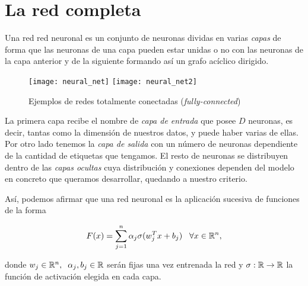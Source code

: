 \section{La red completa}

Una red red neuronal es un conjunto de neuronas dividas en varias \emph{capas} de forma que las neuronas de una capa pueden estar unidas o no con las neuronas de la capa anterior y de la siguiente formando así un grafo acíclico dirigido.\newline

\begin{figure}[htpb]
  \centering
  \texttt{[image: neural\_net]}
  \vrule
  \texttt{[image: neural\_net2]}
  \caption{Ejemplos de redes totalmente conectadas (\emph{fully-connected}) \cite{stanford} }
  \label{fig:fully-connected}
\end{figure}

La primera capa recibe el nombre de \emph{capa de entrada} que posee $D$ neuronas, es decir, tantas como la dimensión de nuestros datos, y puede haber varias de ellas. Por otro lado tenemos la \emph{capa de salida} con un número de neuronas dependiente de la cantidad de etiquetas que tengamos. El resto de neuronas se distribuyen dentro de las \emph{capas ocultas} cuya distribución y conexiones dependen del modelo en concreto que queramos desarrollar, quedando a nuestro criterio.\newline


Así, podemos afirmar que una red neuronal es la aplicación sucesiva de funciones de la forma

$$F(x)=\sum_{j=1}^n \alpha_j \sigma(w_j^Tx+b_j) \;\;\; \forall x \in \mathbb{R}^n,$$

donde $w_j\in\mathbb{R}^n,\;\; \alpha_j,b_j\in\mathbb{R}$ serán fijas una vez entrenada la red y $\sigma : \mathbb{R} \to \mathbb{R}$ la función de activación elegida en cada capa.\\

